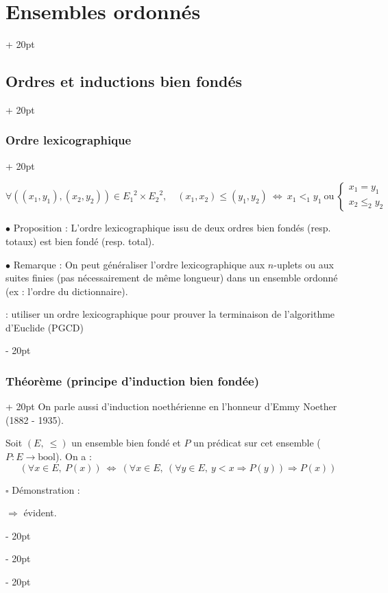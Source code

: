 \documentclass[a4paper, 12pt, twoside]{article}
\newcommand{\ssi}{\ \Leftrightarrow \ }
\newcommand{\eqsys}[2]{\begin{cases} #1 \\ #2 \end{cases}}
\renewcommand{\le}{\leqslant}
\newcommand{\ind}[1][20pt]{\advance\leftskip + #1}
\newcommand{\deind}[1][20pt]{\advance\leftskip - #1}
\newenvironment{indt}[2][20pt]{#2 \par \ind[#1]}{\par \deind} %
\begin{document}
\begin{indt}{\section{Ensembles ordonnés}}
\begin{indt}{\subsection{Ordres et inductions bien fondés}}
\begin{indt}{\subsubsection{Ordre lexicographique}}
                \vspace{6pt}
                    
                    $
                        \forall ((x_1, y_1), (x_2, y_2)) \in {E_1}^2 \times {E_2}^2,\quad
                        (x_1, x_2) \le (y_1, y_2) \ssi x_1 <_1 y_1 \ \text{ou}\ \eqsys{x_1 = y_1}{x_2 \le_2 y_2}
                    $
                
                \vspace{12pt}
                
                $\bullet$ Proposition : L'ordre lexicographique issu de deux ordres bien fondés (resp. totaux) est bien fondé (resp. total).
                
                \vspace{6pt}
                
                $\bullet$ Remarque : On peut généraliser l'ordre lexicographique aux $n$-uplets ou aux suites finies (pas nécessairement de même longueur) dans un ensemble ordonné (ex : l'ordre du dictionnaire).
                
                 : utiliser un ordre lexicographique pour prouver la terminaison de l'algorithme d'Euclide (PGCD)
            \end{indt}
            
            \vspace{6pt}
            
            \begin{indt}{\subsubsection{Théorème (principe d'induction bien fondée)}}
                On parle aussi d'induction noethérienne en l'honneur d'Emmy Noether (1882 - 1935).
                
                \vspace{6pt}
                
                Soit $(E,\ \le)$ un ensemble bien fondé et $P$ un prédicat sur cet ensemble
                ($P : E \longrightarrow \mathrm{bool}$). On a :
                    \[ (\forall x \in E,\ P(x)) \ssi (\forall x \in E,\ (\forall y \in E,\ y < x \Rightarrow P(y)) \Rightarrow P(x)) \]
                
                $\square$ Démonstration :
                
                $\Rightarrow$ évident.
                

\end{indt}
\end{indt}
\end{indt}
\end{document}
